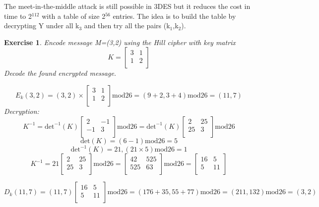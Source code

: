 \documentclass[a4paper, 12pt]{report}
\newtheorem{exercise}{\textbf{Exercise}}
\begin{document}
The meet-in-the-middle attack is still possible in 3DES but it reduces the cost in time to 2$^{112}$ with a table of size 2$^{56}$ entries. The idea is to build the table by decrypting Y under all k$_3$ and then try all the pairs (k$_1$,k$_2$).

\begin{exercise}
	Encode message M=(3,2) using the Hill cipher with key matrix
	\[K=
	\left[ \begin{array}{cc}
		3 & 1 \\
		1 & 2 \\
	\end{array} \right]
	\]
	Decode the found encrypted message.
	
	\[E_k(3,2) = (3,2) \times 
	\left[ \begin{array}{cc}
		3 & 1 \\
		1 & 2 \\
	\end{array} \right] \text{mod}26 = (9+2,3+4) \text{mod}26 = (11,7)
	\]
	Decryption:
	\[K^{-1} = \text{det}^{-1}(K)
	\left[ \begin{array}{cc}
		2 & -1 \\
		-1 & 3 \\
	\end{array} \right] \text{mod}26 =
	\text{det}^{-1}(K)
	\left[ \begin{array}{cc}
		2 & 25 \\
		25 & 3 \\
	\end{array} \right] \text{mod}26 
	\]
	\[
	\text{det}(K)=(6-1) \text{mod}26=5
	\]
	\[\text{det}^{-1}(K)=21, (21\times 5) \text{mod}26 =1\]
	\[
	K^{-1} =
	21
	\left[ \begin{array}{cc}
	2 & 25 \\
	25 & 3 \\
	\end{array} \right] \text{mod}26 =
	\left[ \begin{array}{cc}
		42 & 525 \\
		525 & 63 \\
	\end{array} \right] \text{mod}26 = 
	\left[ \begin{array}{cc}
	16 & 5 \\
	5 & 11 \\
	\end{array} \right]
	\]
	
	\[D_k(11,7) = 
	(11,7)
	\left[ \begin{array}{cc}
	16 & 5 \\
	5 & 11 \\
	\end{array} \right]\text{mod}26= (176+35, 55+77) \text{mod}26 = (211, 132) \text{mod}26 = (3,2)
	\]
\end{exercise}
\end{document}
